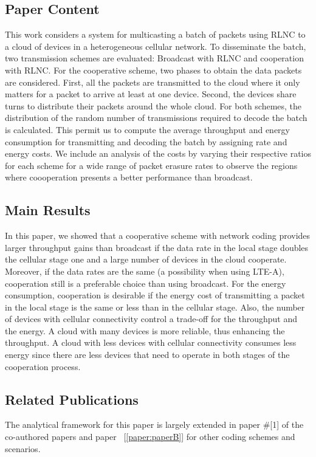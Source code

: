 \subsection*{Paper Content}
This work considers a system for multicasting a batch of packets using \ac{RLNC} to a cloud of devices in a heterogeneous cellular network. To disseminate the batch, two transmission schemes are evaluated: Broadcast with \ac{RLNC} and cooperation with \ac{RLNC}. For the cooperative scheme, two phases to obtain the data packets are considered. First, all the packets are transmitted to the cloud where it only matters for a packet to arrive at least at one device. Second, the devices share turns to distribute their packets around the whole cloud. For both schemes, the distribution of the random number of transmissions required to decode the batch is calculated. This permit us to compute the average throughput and energy consumption for transmitting and decoding the batch by assigning rate and energy costs. We include an analysis of the costs by varying their respective ratios for each scheme for a wide range of packet erasure rates to observe the regions where coooperation presents a better performance than broadcast.

\subsection*{Main Results}
In this paper, we showed that a cooperative scheme with network coding provides larger throughput gains than broadcast if the data rate in the local stage doubles the cellular stage one and a large number of devices in the cloud cooperate. Moreover, if the data rates are the same (a possibility when using \ac{LTE-A}), cooperation still is a preferable choice than using broadcast. For the energy consumption, cooperation is desirable if the energy cost of transmitting a packet in the local stage is the same or less than in the cellular stage. Also, the number of devices with cellular connectivity control a trade-off for the throughput and the energy. A cloud with many devices is more reliable, thus enhancing the throughput. A cloud with less devices with cellular connectivity consumes less energy since there are less devices that need to operate in both stages of the cooperation process.

\subsection*{Related Publications}
The analytical framework for this paper is largely extended in paper \#[1] of the co-authored papers and paper ~[\ref{paper:paperB}] for other coding schemes and scenarios.

